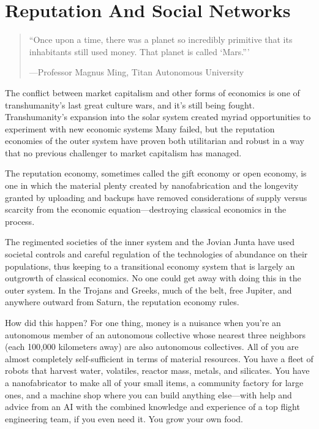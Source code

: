 \section{Reputation And Social Networks} 

\begin{quote} ``Once upon a time, there was a planet so incredibly primitive that its inhabitants still used money. That planet is called ‘Mars.''' 

—Professor Magnus Ming, Titan Autonomous University \end{quote} 

The conflict between market capitalism and other forms of economics is one of transhumanity's last great culture wars, and it's still being fought. Transhumanity's expansion into the solar system created myriad opportunities to experiment with new economic systems Many failed, but the reputation economies of the outer system have proven both utilitarian and robust in a way that no previous challenger to market capitalism has managed. 

The reputation economy, sometimes called the gift economy or open economy, is one in which the material plenty created by nanofabrication and the longevity granted by uploading and backups have removed considerations of supply versus scarcity from the economic equation—destroying classical economics in the process. 

The regimented societies of the inner system and the Jovian Junta have used societal controls and careful regulation of the technologies of abundance on their populations, thus keeping to a transitional economy system that is largely an outgrowth of classical economics. No one could get away with doing this in the outer system. In the Trojans and Greeks, much of the belt, free Jupiter, and anywhere outward from Saturn, the reputation economy rules. 

How did this happen? For one thing, money is a nuisance when you're an autonomous member of an autonomous collective whose nearest three neighbors (each 100,000 kilometers away) are also autonomous collectives. All of you are almost completely self-sufficient in terms of material resources. You have a fleet of robots that harvest water, volatiles, reactor mass, metals, and silicates. You have a nanofabricator to make all of your small items, a community factory for large ones, and a machine shop where you can build anything else—with help and advice from an AI with the combined knowledge and experience of a top flight engineering team, if you even need it. You grow your own food. 



